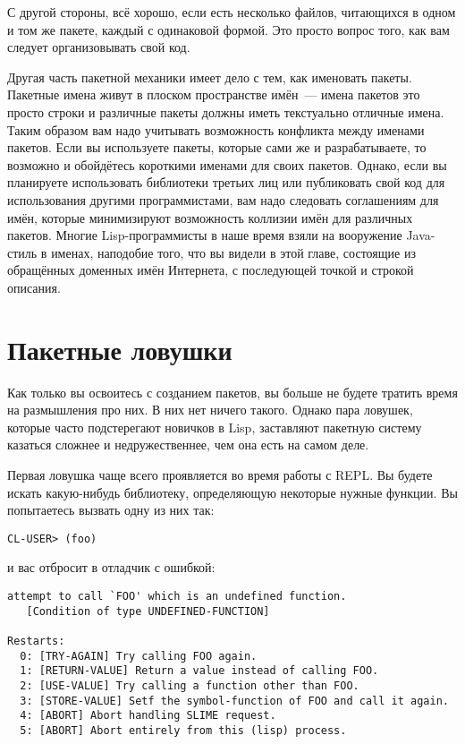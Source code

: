 С другой стороны, всё хорошо, если есть несколько файлов, читающихся в одном и том же
пакете, каждый с одинаковой формой. Это просто вопрос того, как вам
следует организовывать свой код.

Другая часть пакетной механики имеет дело с тем, как именовать пакеты. Пакетные имена
живут в плоском пространстве имён~--- имена пакетов это просто строки и различные пакеты
должны иметь текстуально отличные имена. Таким образом вам надо учитывать возможность
конфликта между именами пакетов. Если вы используете пакеты, которые сами же и
разрабатываете, то возможно и обойдётесь короткими именами для своих пакетов. Однако, если
вы планируете использовать библиотеки третьих лиц или публиковать свой код для
использования другими программистами, вам надо следовать соглашениям для имён, которые
минимизируют возможность коллизии имён для различных пакетов. Многие Lisp-программисты в
наше время взяли на вооружение Java-стиль в именах, наподобие того, что вы видели в этой
главе, состоящие из обращённых доменных имён Интернета, с последующей точкой и строкой
описания.

\section{Пакетные ловушки}
\label{sec:21-pitfalls}

Как только вы освоитесь с созданием пакетов, вы больше не будете тратить время на
размышления про них. В них нет ничего такого. Однако пара ловушек, которые часто
подстерегают новичков в Lisp, заставляют пакетную систему казаться сложнее и
недружественнее, чем она есть на самом деле.

Первая ловушка чаще всего проявляется во время работы с REPL. Вы будете искать
какую-нибудь библиотеку, определяющую некоторые нужные функции. Вы попытаетесь вызвать
одну из них так:

\begin{lstlisting}[style=lisprepl]
CL-USER> (foo)
\end{lstlisting}

\noindent{}и вас отбросит в отладчик с ошибкой:

\begin{lstlisting}
attempt to call `FOO' which is an undefined function.
   [Condition of type UNDEFINED-FUNCTION]

Restarts:
  0: [TRY-AGAIN] Try calling FOO again.
  1: [RETURN-VALUE] Return a value instead of calling FOO.
  2: [USE-VALUE] Try calling a function other than FOO.
  3: [STORE-VALUE] Setf the symbol-function of FOO and call it again.
  4: [ABORT] Abort handling SLIME request.
  5: [ABORT] Abort entirely from this (lisp) process.
\end{lstlisting}

